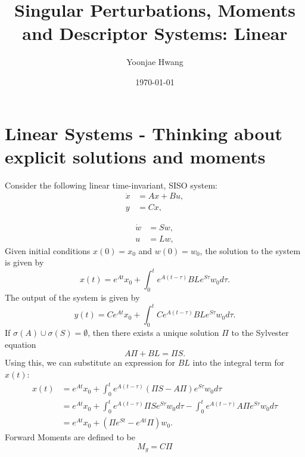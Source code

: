 \documentclass{article}
\title{Singular Perturbations, Moments and Descriptor Systems: Linear}
\author{Yoonjae Hwang}
\date{\today}
\begin{document}
\maketitle

\section{Linear Systems - Thinking about explicit solutions and moments}
Consider the following linear time-invariant, SISO system:
\label{sec:linear-systems}
\begin{equation}
\begin{aligned}
\dot{x} &= A x + B u, \\
y & = Cx,
\end{aligned}
\end{equation}

\begin{equation}
\begin{aligned}
\dot{w} &= Sw, \\
u &= Lw,
\end{aligned}
\end{equation}
Given initial conditions \(x(0) = x_0\) and \(w(0) = w_0\), the solution to the system is given by
\begin{equation}
x(t) = e^{At} x_0 + \int_0^t e^{A(t-\tau)} B L e^{S\tau} w_0 d\tau.
\end{equation}
The output of the system is given by
\begin{equation}
y(t) = C e^{At} x_0 + \int_0^t C e^{A(t-\tau)} B L e^{S\tau} w_0 d\tau.
\end{equation}
If $\sigma(A) \cup \sigma(S) = \emptyset$, then there exists a unique solution $\Pi$ to the Sylvester equation
\begin{equation}
A \Pi + B L = \Pi S.
\end{equation}
Using this, we can substitute an expression for \(B L\) into the integral term for $x(t)$:
\begin{equation}
\begin{aligned}
x(t) &= e^{At} x_0 + \int_0^t e^{A(t-\tau)} (\Pi S - A \Pi) e^{S\tau} w_0 d\tau \\
&= e^{At} x_0 + \int_0^t e^{A(t-\tau)} \Pi S e^{S\tau} w_0 d\tau - \int_0^t e^{A(t-\tau)} A \Pi e^{S\tau} w_0 d\tau \\
&= e^{At} x_0 + \left( \Pi e^{St} - e^{At} \Pi \right) w_0 .
\end{aligned}
\end{equation}
Forward Moments are defined to be 
\begin{equation}
M_g = C \Pi
\end{equation}
\end{document}
